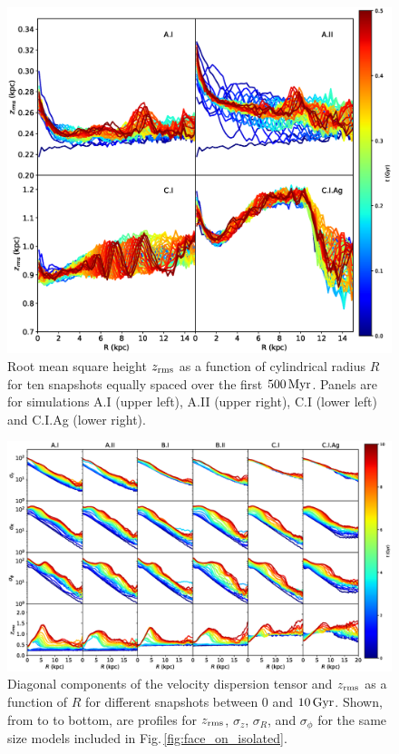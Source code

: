 \begin{figure}
	\centering
	\includegraphics[width=\textwidth]{../figures/isolated_four_panel_zrms.eps}
	\caption{Root mean square height $z_{\rm rms}$ as a function of
          cylindrical radius $R$ for ten snapshots equally spaced over
          the first $500\,{\rm Myr}$.  Panels are for simulations A.I
          (upper left), A.II (upper right), C.I (lower left) and
          C.I.Ag (lower right).} \label{fig:zrms}
\end{figure}

\begin{figure}
	\centering
	\includegraphics[width=\textwidth]{../figures/isolated_dispersion_evolution_with_agama_zrms.eps}
	\caption{Diagonal components of the velocity dispersion tensor
          and $z_{\rm rms}$ as a function of $R$ for different snapshots
          between $0$ and $10\,{\rm Gyr}$.  Shown, from to to bottom,
          are profiles for $z_{\rm rms}$, $\sigma_z$, $\sigma_R$, and $\sigma_\phi$
          for the same size models included in
          Fig.\,\ref{fig:face_on_isolated}.} \label{fig:isolated_dispersions}
\end{figure}

